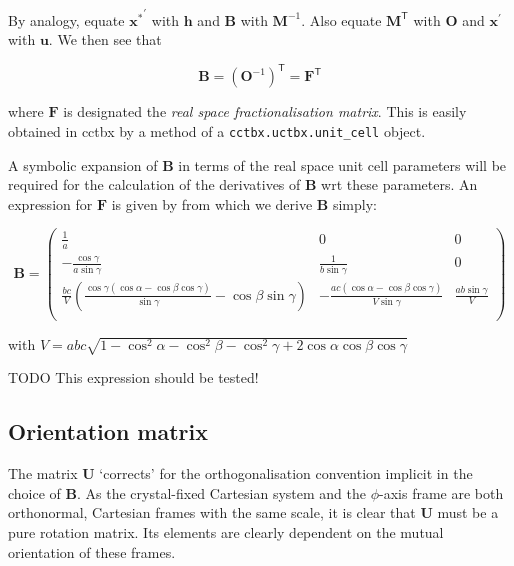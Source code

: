 \documentclass[a4paper, 11pt]{article}
\renewcommand{\vec}[1]{\mathbf{#1}}
\begin{document}
By analogy, equate $\vec{x^*}^\prime$ with $\vec{h}$ and $\mathbf{B}$ with
$\mathbf{M}^{-1}$. Also equate $\mathbf{M}^\mathsf{T}$ with $\mathbf{O}$ and 
$\vec{x}^\prime$ with $\vec{u}$. We then see that

\begin{equation}
\label{eq:reciprocalortho}
\mathbf{B} = \left( \mathbf{O}^{-1} \right)^\mathsf{T} = \mathbf{F}^\mathsf{T}
\end{equation}

where $\mathbf{F}$ is designated the \emph{real space fractionalisation matrix}.
This is easily obtained in cctbx by a method of a \verb!cctbx.uctbx.unit_cell!
object.

A symbolic expansion of $\mathbf{B}$ in terms of the real space unit cell
parameters will be required for the calculation of the derivatives of
$\mathbf{B}$ wrt these parameters. An expression for $\mathbf{F}$ is given by
\citet{ruppwebb_transformation} from which we derive $\mathbf{B}$ simply:

\begin{equation}
\label{eq:recipspaceorthomatrix}
\mathbf{B} = 
\begin{pmatrix}
\frac{1}{a} &
0 &
0 \\
-\frac{\cos{\gamma}}{a\sin{\gamma}} &
\frac{1}{b\sin{\gamma}} &
0 \\
\frac{bc}{V}\left( \frac{\cos{\gamma} \left( \cos{\alpha} - \cos{\beta}\cos{\gamma} \right)}{\sin{\gamma}} - \cos{\beta}\sin{\gamma} \right) &
-\frac{ac \left( \cos{\alpha} - \cos{\beta}\cos{\gamma} \right)}{V\sin{\gamma}} &
\frac{ab\sin{\gamma}}{V} \\
\end{pmatrix}
\end{equation}

with $V = abc \sqrt{ 1 - \cos^2{\alpha} - \cos^2{\beta} - \cos^2{\gamma} + 2 \cos{\alpha}\cos{\beta}\cos{\gamma}}$

TODO This expression should be tested!

\subsection{Orientation matrix} \label{sec:U_matrix}

The matrix $\mathbf{U}$ `corrects' for the orthogonalisation convention
implicit in the choice of $\mathbf{B}$. As the crystal-fixed Cartesian system and
the $\phi$-axis frame are both orthonormal, Cartesian frames with the same scale,
it is clear that $\mathbf{U}$ must be a pure rotation matrix. Its elements are
clearly dependent on the mutual orientation of these frames.
\end{document}
